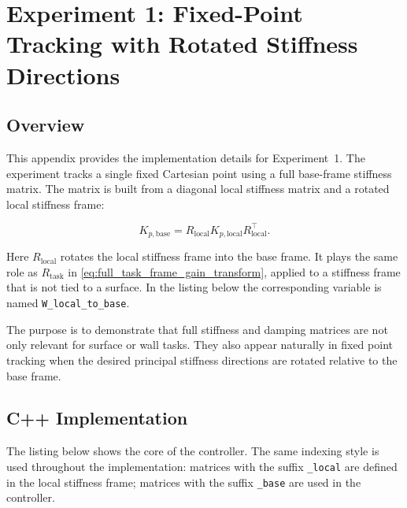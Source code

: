 ﻿\chapter{Experiment 1: Fixed-Point Tracking with Rotated Stiffness Directions}
\label{app:exp1}

\section{Overview}

This appendix provides the implementation details for
Experiment~1. The experiment tracks a single fixed Cartesian point using a full
base-frame stiffness matrix. The matrix is built from a diagonal local stiffness
matrix and a rotated local stiffness frame:

\begin{equation}
K_{p,\mathrm{base}}
=
R_{\mathrm{local}}
K_{p,\mathrm{local}}
R_{\mathrm{local}}^\top .
\end{equation}

Here \(R_{\mathrm{local}}\) rotates the local stiffness frame into the base
frame. It plays the same role as \(R_{\mathrm{task}}\) in
\cref{eq:full_task_frame_gain_transform}, applied to a stiffness frame that is
not tied to a surface. In the listing below the corresponding variable is named
\texttt{W\_local\_to\_base}.

The purpose is to demonstrate that full stiffness and damping matrices are not
only relevant for surface or wall tasks. They also appear naturally in fixed
point tracking when the desired principal stiffness directions are rotated
relative to the base frame.

\section{C++ Implementation}

The listing below shows the core of the controller. The same indexing style is
used throughout the implementation: matrices with the suffix
\texttt{\_local} are defined in the local stiffness frame; matrices with the
suffix \texttt{\_base} are used in the controller.

